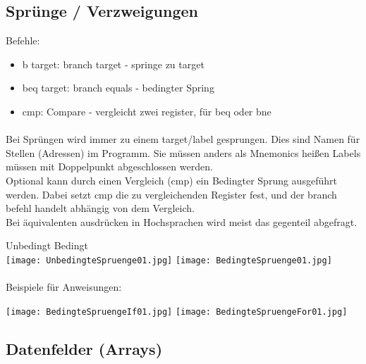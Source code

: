 	\subsection{Sprünge / Verzweigungen}
		Befehle:
		\begin{itemize}
			\item b target: branch target - springe zu target
			\item beq target: branch equals - bedingter Spring
			\item cmp: Compare - vergleicht zwei register, für beq oder bne
		\end{itemize}

		\paragraph{} Bei Sprüngen wird immer zu einem target/label gesprungen. Dies sind
		Namen für Stellen (Adressen) im Programm. Sie müssen anders als Mnemonics hei\ss en
		Labels müssen mit Doppelpunkt abgeschlossen werden. \\
		Optional kann durch einen Vergleich (cmp) ein Bedingter Sprung ausgeführt werden. 
		Dabei setzt cmp die zu vergleichenden Register fest, und der branch befehl handelt
		abhängig von dem Vergleich. \\
		Bei äquivalenten ausdrücken in Hochsprachen wird meist das gegenteil abgefragt.
		\begin{center}
			Unbedingt \hspace{8cm} Bedingt \hspace{2cm} \textcolor{white}{.} \\
			\texttt{[image: UnbedingteSpruenge01.jpg]}
			\texttt{[image: BedingteSpruenge01.jpg]}
		\end{center}

		\paragraph{} Beispiele für Anweisungen:
		\begin{center}
			\texttt{[image: BedingteSpruengeIf01.jpg]}
			\texttt{[image: BedingteSpruengeFor01.jpg]}
		\end{center}



	\subsection{Datenfelder (Arrays)}
